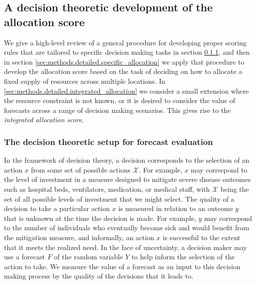 \documentclass{article}
\begin{document}
\subsection{A decision theoretic development of the allocation score}
\label{sec:methods.detailed}

We give a high-level review of a general procedure for developing proper scoring rules that are tailored to specific decision making tasks in section \ref{sec:methods.detailed.decisiontheory}, and then in section \ref{sec:methods.detailed.specific_allocation} we apply that procedure to develop the allocation score based on the task of deciding on how to allocate a fixed supply of resources across multiple locations. In \ref{sec:methods.detailed.integrated_allocation} we consider a small extension where the resource constraint is not known, or it is desired to consider the value of forecasts across a range of decision making scenarios. This gives rise to the \emph{integrated allocation score}.

\subsubsection{The decision theoretic setup for forecast evaluation}
\label{sec:methods.detailed.decisiontheory}


In the framework of decision theory, a decision corresponds to the selection of an action $x$ from some set of possible actions $\mathcal{X}$. For example, $x$ may correspond to the level of investment in a measure designed to mitigate severe disease outcomes such as hospital beds, ventilators, medication, or medical staff, with $\mathcal{X}$ being the set of all possible levels of investment that we might select. The quality of a decision to take a particular action $x$ is measured in relation to an outcome $y$ that is unknown at the time the decision is made. For example, $y$ may correspond to the number of individuals who eventually become sick and would benefit from the mitigation measure, and informally, an action $x$ is successful to the extent that it meets the realized need. In the face of uncertainty, a decision maker may use a forecast $F$ of the random variable $Y$ to help inform the selection of the action to take. We measure the value of a forecast as an input to this decision making process by the quality of the decisions that it leads to.
\end{document}
